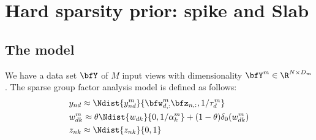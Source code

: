 \documentclass[10pt, a4paper,openany]{report}
\begin{document}
\section{Hard sparsity prior: spike and Slab}

\subsection{The model}
We have a data set $\bfY$ of $M$ input views with dimensionality $\bfY^m \in \R^{N \times D_m}$. The sparse group factor analysis model is defined as follows:
\begin{align}
&y_{nd} \approx \Ndist{y_{nd}^m}{\bfw_{d,:}^m\bfz_{n,:},1/\tau_d^m} \\
&w_{dk}^m \approx \theta\Ndist{w_{dk}}{0,1/\alpha_k^m} + (1-\theta)\delta_0(w_{dk}^m)\\
&z_{nk} \approx \Ndist{z_{nk}}{0,1}
\end{align}
\end{document}
